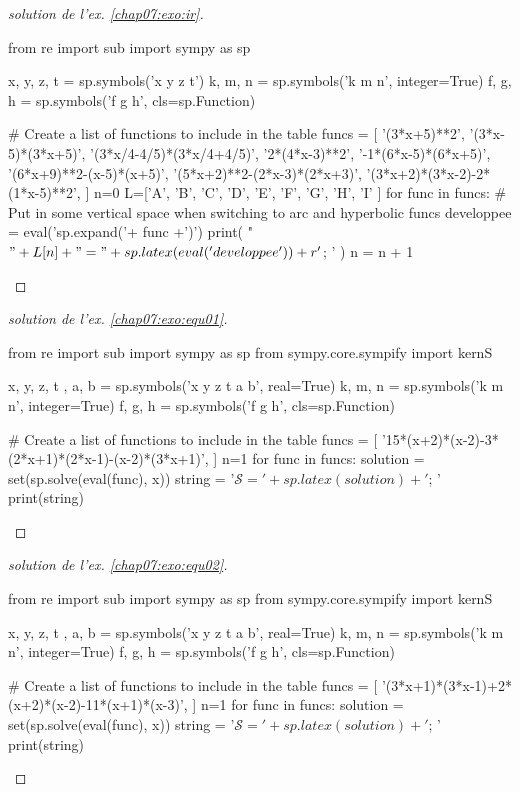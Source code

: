 \documentclass[main.tex]{subfiles}
\begin{document}
\begin{proof}[solution de l'ex. \ref{chap07:exo:ir}]
\begin{pycode}
from re import sub
import sympy as sp

x, y, z, t = sp.symbols('x y z t')
k, m, n = sp.symbols('k m n', integer=True)
f, g, h = sp.symbols('f g h', cls=sp.Function)

# Create a list of functions to include in the table
funcs = [
'(3*x+5)**2', 
'(3*x-5)*(3*x+5)', 
'(3*x/4-4/5)*(3*x/4+4/5)',
'2*(4*x-3)**2',
'-1*(6*x-5)*(6*x+5)', 
'(6*x+9)**2-(x-5)*(x+5)',
'(5*x+2)**2-(2*x-3)*(2*x+3)', 
'(3*x+2)*(3*x-2)-2*(1*x-5)**2', 
]
n=0
L=['A', 'B', 'C', 'D', 'E', 'F', 'G', 'H', 'I'  ]
for func in funcs:
	# Put in some vertical space when switching to arc and hyperbolic funcs 
	developpee =  eval('sp.expand('+ func +')') 
	print( "$"+L[n] + "=" + sp.latex( eval('developpee') )  + r'$; ' ) 
	n     = n + 1 
\end{pycode}
\end{proof}
\begin{proof}[solution de l'ex. \ref{chap07:exo:equ01}]  
\begin{pycode}
from re import sub
import sympy as sp
from sympy.core.sympify import kernS

x, y, z, t , a, b = sp.symbols('x y z t a b', real=True)
k, m, n = sp.symbols('k m n', integer=True)
f, g, h = sp.symbols('f g h', cls=sp.Function)

# Create a list of functions to include in the table
funcs = [
'15*(x+2)*(x-2)-3*(2*x+1)*(2*x-1)-(x-2)*(3*x+1)',  
]
n=1 
for func in funcs: 
	solution = set(sp.solve(eval(func), x))
	string =  '$\mathscr{S}='+   sp.latex(solution ) + '$; '
	print(string) 
\end{pycode}  
\end{proof}
\begin{proof}[solution de l'ex. \ref{chap07:exo:equ02}]  
\begin{pycode}
from re import sub
import sympy as sp
from sympy.core.sympify import kernS

x, y, z, t , a, b = sp.symbols('x y z t a b', real=True)
k, m, n = sp.symbols('k m n', integer=True)
f, g, h = sp.symbols('f g h', cls=sp.Function)

# Create a list of functions to include in the table
funcs = [
'(3*x+1)*(3*x-1)+2*(x+2)*(x-2)-11*(x+1)*(x-3)',  
]
n=1 
for func in funcs: 
	solution = set(sp.solve(eval(func), x))
	string =  '$\mathscr{S}='+   sp.latex(solution ) + '$; '
	print(string) 
\end{pycode}  
\end{proof}
\end{document}
